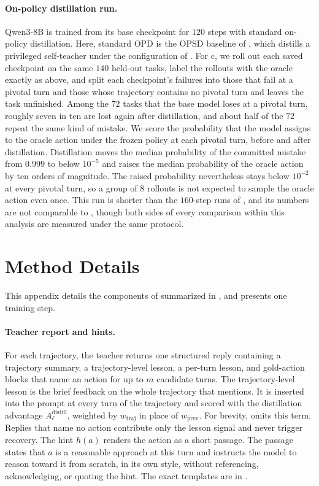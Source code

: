 \paragraph{On-policy distillation run.} Qwen3-8B is trained from its base checkpoint for $120$ steps with standard on-policy distillation. Here, standard OPD is the OPSD baseline of , which distills a privileged self-teacher \citep{zhao2026opsd} under the configuration of . For c, we roll out each saved checkpoint on the same $140$ held-out tasks, label the rollouts with the oracle exactly as above, and split each checkpoint's failures into those that fail at a pivotal turn and those whose trajectory contains no pivotal turn and leaves the task unfinished. Among the $72$ tasks that the base model loses at a pivotal turn, roughly seven in ten are lost again after distillation, and about half of the $72$ repeat the same kind of mistake. We score the probability that the model assigns to the oracle action under the frozen policy at each pivotal turn, before and after distillation. Distillation moves the median probability of the committed mistake from $0.999$ to below $10^{-5}$ and raises the median probability of the oracle action by ten orders of magnitude. The raised probability nevertheless stays below $10^{-2}$ at every pivotal turn, so a group of $8$ rollouts is not expected to sample the oracle action even once. This run is shorter than the $160$-step runs of , and its numbers are not comparable to , though both sides of every comparison within this analysis are measured under the same protocol.

\section{Method Details}
\label{app:method_details}

This appendix details the components of \method{} summarized in , and  presents one training step.

\paragraph{Teacher report and hints.} For each trajectory, the teacher returns one structured reply containing a trajectory summary, a trajectory-level lesson, a per-turn lesson, and gold-action blocks that name an action for up to $m$ candidate turns. The trajectory-level lesson is the brief feedback on the whole trajectory that  mentions. It is inserted into the prompt at every turn of the trajectory and scored with the distillation advantage $A^{\mathrm{distill}}_\ell$, weighted by $w_\text{traj}$ in place of $w_\text{prev}$. For brevity,  omits this term. Replies that name no action contribute only the lesson signal and never trigger recovery. The hint $h(a)$ renders the action as a short passage. The passage states that $a$ is a reasonable approach at this turn and instructs the model to reason toward it from scratch, in its own style, without referencing, acknowledging, or quoting the hint. The exact templates are in .


